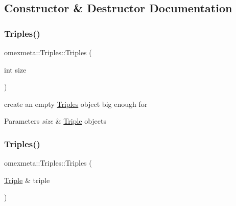 \subsection{Constructor \& Destructor Documentation}
\mbox{\label{classomexmeta_1_1Triples_a32ea34c1fd3bfe9887c2221377392efe}} 
\subsubsection{\texorpdfstring{Triples()}{Triples()}\hspace{0.1cm}{\footnotesize\ttfamily [1/2]}}
{\footnotesize\ttfamily omexmeta\+::\+Triples\+::\+Triples (\begin{DoxyParamCaption}\item[{int}]{size }\end{DoxyParamCaption})\hspace{0.3cm}{\ttfamily [explicit]}}



create an empty \hyperlink{classomexmeta_1_1Triples}{Triples} object big enough for 


\begin{DoxyParams}{Parameters}
{\em size} & \hyperlink{classomexmeta_1_1Triple}{Triple} objects \\
\hline
\end{DoxyParams}
\mbox{\label{classomexmeta_1_1Triples_a733eea0f6a2c206eb96771bc7a8cb430}} 
\subsubsection{\texorpdfstring{Triples()}{Triples()}\hspace{0.1cm}{\footnotesize\ttfamily [2/2]}}
{\footnotesize\ttfamily omexmeta\+::\+Triples\+::\+Triples (\begin{DoxyParamCaption}\item[{\hyperlink{classomexmeta_1_1Triple}{Triple} \&}]{triple }\end{DoxyParamCaption})\hspace{0.3cm}{\ttfamily [explicit]}}



